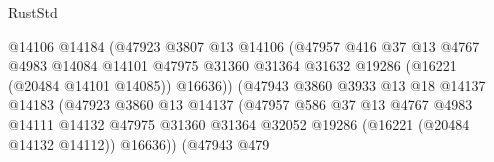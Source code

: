 \begin{lexlean}{RustStd}
\begin{coremodule}
                                          @14106
                                          @14184
                                          (@47923
                                            @3807
                                            @13
                                            @14106
                                            (@47957
                                              @416
                                              @37
                                              @13
                                              @4767
                                              @4983
                                              @14084
                                              @14101
                                              @47975
                                              @31360
                                              @31364
                                              @31632
                                              @19286
                                              (@16221 (@20484 @14101 @14085))
                                              @16636))
                                          (@47943
                                            @3860
                                            @3933
                                            @13
                                            @18
                                            @14137
                                            @14183
                                            (@47923
                                              @3860
                                              @13
                                              @14137
                                              (@47957
                                                @586
                                                @37
                                                @13
                                                @4767
                                                @4983
                                                @14111
                                                @14132
                                                @47975
                                                @31360
                                                @31364
                                                @32052
                                                @19286
                                                (@16221 (@20484 @14132 @14112))
                                                @16636))
                                            (@47943
                                              @479

\end{coremodule}
\end{lexlean}
